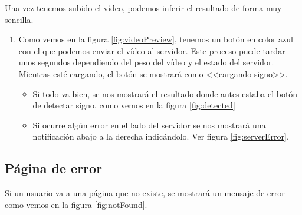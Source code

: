 Una vez tenemos subido el vídeo, podemos inferir el resultado de forma muy sencilla.

\begin{enumerate}
  \item Como vemos en la figura \ref{fig:videoPreview}, tenemos un botón en color azul con el que podemos enviar el vídeo al servidor. Este proceso puede tardar unos segundos dependiendo del peso del vídeo y el estado del servidor.
        Mientras esté cargando, el botón se mostrará como <<cargando signo>>.

        \begin{itemize}
          \item Si todo va bien, se nos mostrará el resultado donde antes estaba el botón de detectar signo, como vemos en la figura \ref{fig:detected}


          \item Si ocurre algún error en el lado del servidor se nos mostrará una notificación abajo a la derecha indicándolo. Ver figura \ref{fig:serverError}.

        \end{itemize}
\end{enumerate}

\subsection{Página de error}

Si un usuario va a una página que no existe, se mostrará un mensaje de error como vemos en la figura \ref{fig:notFound}.
